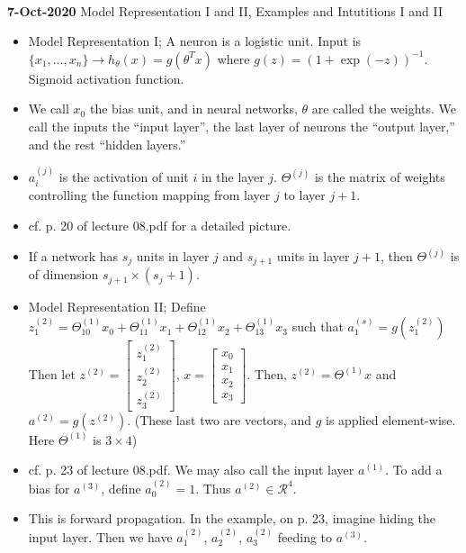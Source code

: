 \documentclass[10pt]{article}
\begin{document}
\hfill \\
{\large \textbf{7-Oct-2020} Model Representation I and II, Examples and Intutitions I and II}
\begin{itemize}
  \item Model Representation I; A neuron is a logistic unit. Input is $\{x_1,\dots,x_n\} \rightarrow h_{\theta}(x) = g(\theta^Tx)$ where $g(z) = (1+\exp(-z))^{-1}$. Sigmoid activation function.
  \item We call $x_0$ the bias unit, and in neural networks, $\theta$ are called the weights. We call the inputs the ``input layer'', the last layer of neurons the ``output layer,'' and the rest ``hidden layers.''
  \item $a_i^{(j)}$ is the activation of unit $i$ in the layer $j$. $\Theta^{(j)}$ is the matrix of weights controlling the function mapping from layer $j$ to layer $j+1$.
  \item cf. p. 20 of lecture 08.pdf for a detailed picture.
  \item If a network has $s_j$ units in layer $j$ and $s_{j+1}$ units in layer $j+1$, then $\Theta^{(j)}$ is of dimension $s_{j+1} \times (s_j + 1)$.
  \item Model Representation II; Define $z_1^{(2)} = \Theta^{(1)}_{10}x_0 + \Theta^{(1)}_{11}x_1 + \Theta^{(1)}_{12}x_2 + \Theta^{(1)}_{13}x_3$ such that $a_1^{(s)} = g(z_1^{(2)})$ \hfill \\
    Then let $z^{(2)} = \begin{bmatrix}z_1^{(2)} \\ z_2^{(2)} \\ z_3^{(2)} \end{bmatrix}$, $x = \begin{bmatrix} x_0 \\ x_1 \\ x_2 \\ x_3 \end{bmatrix}$. Then, $z^{(2)} = \Theta^{(1)}x$ and $a^{(2)} = g(z^{(2)})$. (These last two are vectors, and $g$ is applied element-wise. Here $\Theta^{(1)}$ is $3 \times 4$)
  \item cf. p. 23 of lecture 08.pdf. We may also call the input layer $a^{(1)}$. To add a bias for $a^{(3)}$, define $a_0^{(2)}=1$. Thus $a^{(2)} \in \mathcal{R}^4$. 
  \item This is forward propagation. In the example, on p. 23, imagine hiding the input layer. Then we have $a_1^{(2)}$, $a_2^{(2)}$, $a_3^{(2)}$ feeding to $a^{(3)}$.
    \begin{align*}

\end{align*}
\end{itemize}
\end{document}
